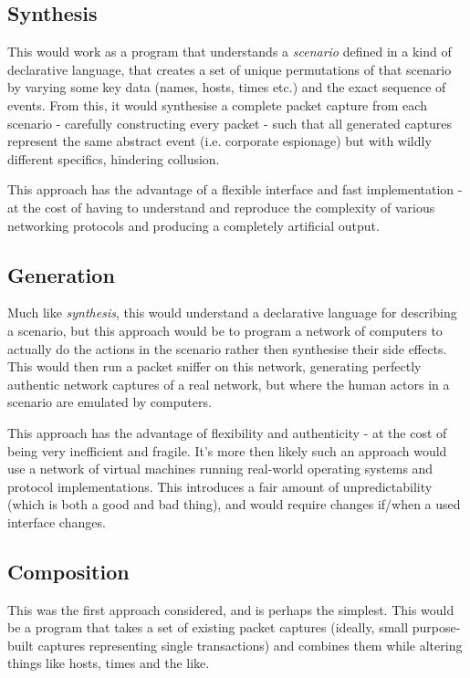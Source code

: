 \documentclass[10pt,a4paper,notitlepage]{report}
\begin{document}
\subsection{Synthesis}
This would work as a program that understands a \emph{scenario} defined in a kind of declarative language, that creates a set of unique permutations of that scenario by varying some key data (names, hosts, times etc.) and the exact sequence of events. From this, it would synthesise a complete packet capture from each scenario - carefully constructing every packet - such that all generated captures represent the same abstract event (i.e. corporate espionage) but with wildly different specifics, hindering collusion.

This approach has the advantage of a flexible interface and fast implementation - at the cost of having to understand and reproduce the complexity of various networking protocols and producing a completely artificial output.

\subsection{Generation}
Much like \emph{synthesis}, this would understand a declarative language for describing a scenario, but this approach would be to program a network of computers to actually do the actions in the scenario rather then synthesise their side effects. This would then run a packet sniffer on this network, generating perfectly authentic network captures of a real network, but where the human actors in a scenario are emulated by computers.

This approach has the advantage of flexibility and authenticity - at the cost of being very inefficient and fragile. It's more then likely such an approach would use a network of virtual machines running real-world operating systems and protocol implementations. This introduces a fair amount of unpredictability (which is both a good and bad thing), and would require changes if/when a used interface changes.

\subsection{Composition}
This was the first approach considered, and is perhaps the simplest. This would be a program that takes a set of existing packet captures (ideally, small purpose-built captures representing single transactions) and combines them while altering things like hosts, times and the like.
\end{document}
